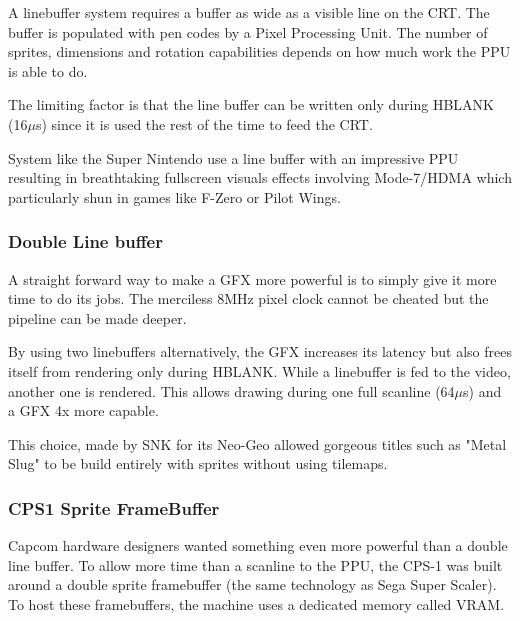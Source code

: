 A linebuffer system requires a buffer as wide as a visible line on the CRT. The buffer is populated with pen codes by a Pixel Processing Unit. The number of sprites, dimensions and rotation capabilities depends on how much work the PPU is able to do. 

The limiting factor is that the line buffer can be written only during HBLANK (16$\mu$s) since it is used the rest of the time to feed the CRT.

System like the Super Nintendo use a line buffer with an impressive PPU resulting in breathtaking fullscreen visuals effects involving Mode-7/HDMA which particularly shun in games like F-Zero or Pilot Wings.








\subsubsection{Double Line buffer}
A straight forward way to make a GFX more powerful is to simply give it more time to do its jobs. The merciless 8MHz pixel clock cannot be cheated but the pipeline can be made deeper.

By using two linebuffers alternatively, the GFX increases its latency but also frees itself from rendering only during HBLANK. While a linebuffer is fed to the video, another one is rendered. This allows drawing during one full scanline (64$\mu$s) and a GFX 4x more capable. 

This choice, made by SNK for its Neo-Geo allowed gorgeous titles such as "Metal Slug" to be build entirely with sprites without using tilemaps.




\subsubsection{CPS1 Sprite FrameBuffer}
Capcom hardware designers wanted something even more powerful than a double line buffer. To allow more time than a scanline to the PPU, the CPS-1 was built around a double sprite framebuffer (the same technology as  Sega Super Scaler). To host these framebuffers, the machine uses a dedicated memory called VRAM.

